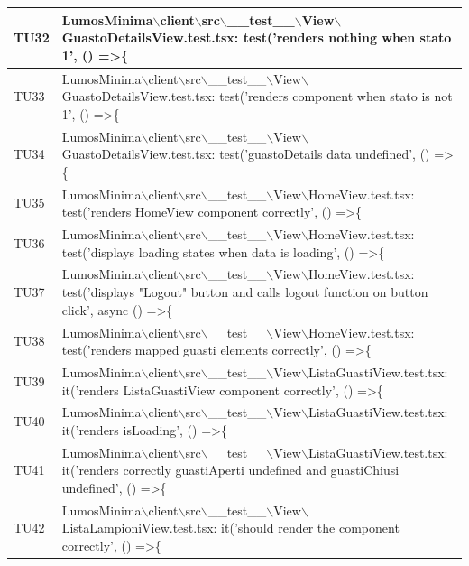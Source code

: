 \documentclass[12pt]{article}
\begin{document}
\begin{scriptsize}
\begin{xltabular}{\linewidth}{|>{\hsize}X|X|}
	TU32 & LumosMinima$\backslash$client$\backslash$src$\backslash$\_\_test\_\_$\backslash$View$\backslash$GuastoDetailsView.test.tsx: test('renders nothing when stato 1', () =\textgreater \{ \\ \hline
	TU33 & LumosMinima$\backslash$client$\backslash$src$\backslash$\_\_test\_\_$\backslash$View$\backslash$GuastoDetailsView.test.tsx: test('renders component when stato is not 1', () =\textgreater \{ \\ \hline
	TU34 & LumosMinima$\backslash$client$\backslash$src$\backslash$\_\_test\_\_$\backslash$View$\backslash$GuastoDetailsView.test.tsx: test('guastoDetails data undefined', () =\textgreater \{ \\ \hline
	TU35 & LumosMinima$\backslash$client$\backslash$src$\backslash$\_\_test\_\_$\backslash$View$\backslash$HomeView.test.tsx: test('renders HomeView component correctly', () =\textgreater \{ \\ \hline
	TU36 & LumosMinima$\backslash$client$\backslash$src$\backslash$\_\_test\_\_$\backslash$View$\backslash$HomeView.test.tsx: test('displays loading states when data is loading', () =\textgreater \{ \\ \hline
	TU37 & LumosMinima$\backslash$client$\backslash$src$\backslash$\_\_test\_\_$\backslash$View$\backslash$HomeView.test.tsx: test('displays "Logout" button and calls logout function on button click', async () =\textgreater \{ \\ \hline
	TU38 & LumosMinima$\backslash$client$\backslash$src$\backslash$\_\_test\_\_$\backslash$View$\backslash$HomeView.test.tsx: test('renders mapped guasti elements correctly', () =\textgreater \{ \\ \hline
	TU39 & LumosMinima$\backslash$client$\backslash$src$\backslash$\_\_test\_\_$\backslash$View$\backslash$ListaGuastiView.test.tsx: it('renders ListaGuastiView component correctly', () =\textgreater \{ \\ \hline
	TU40 & LumosMinima$\backslash$client$\backslash$src$\backslash$\_\_test\_\_$\backslash$View$\backslash$ListaGuastiView.test.tsx: it('renders isLoading', () =\textgreater \{ \\ \hline
	TU41 & LumosMinima$\backslash$client$\backslash$src$\backslash$\_\_test\_\_$\backslash$View$\backslash$ListaGuastiView.test.tsx: it('renders correctly guastiAperti undefined and guastiChiusi undefined', () =\textgreater \{ \\ \hline
	TU42 & LumosMinima$\backslash$client$\backslash$src$\backslash$\_\_test\_\_$\backslash$View$\backslash$ListaLampioniView.test.tsx: it('should render the component correctly', () =\textgreater \{ \\ \hline

\end{xltabular}
\end{scriptsize}
\end{document}
